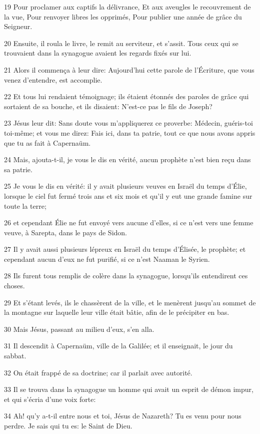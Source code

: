 \par 19 Pour proclamer aux captifs la délivrance, Et aux aveugles le recouvrement de la vue, Pour renvoyer libres les opprimés, Pour publier une année de grâce du Seigneur.
\par 20 Ensuite, il roula le livre, le remit au serviteur, et s'assit. Tous ceux qui se trouvaient dans la synagogue avaient les regards fixés sur lui.
\par 21 Alors il commença à leur dire: Aujourd'hui cette parole de l'Écriture, que vous venez d'entendre, est accomplie.
\par 22 Et tous lui rendaient témoignage; ils étaient étonnés des paroles de grâce qui sortaient de sa bouche, et ils disaient: N'est-ce pas le fils de Joseph?
\par 23 Jésus leur dit: Sans doute vous m'appliquerez ce proverbe: Médecin, guéris-toi toi-même; et vous me direz: Fais ici, dans ta patrie, tout ce que nous avons appris que tu as fait à Capernaüm.
\par 24 Mais, ajouta-t-il, je vous le dis en vérité, aucun prophète n'est bien reçu dans sa patrie.
\par 25 Je vous le dis en vérité: il y avait plusieurs veuves en Israël du temps d'Élie, lorsque le ciel fut fermé trois ans et six mois et qu'il y eut une grande famine sur toute la terre;
\par 26 et cependant Élie ne fut envoyé vers aucune d'elles, si ce n'est vers une femme veuve, à Sarepta, dans le pays de Sidon.
\par 27 Il y avait aussi plusieurs lépreux en Israël du temps d'Élisée, le prophète; et cependant aucun d'eux ne fut purifié, si ce n'est Naaman le Syrien.
\par 28 Ils furent tous remplis de colère dans la synagogue, lorsqu'ils entendirent ces choses.
\par 29 Et s'étant levés, ils le chassèrent de la ville, et le menèrent jusqu'au sommet de la montagne sur laquelle leur ville était bâtie, afin de le précipiter en bas.
\par 30 Mais Jésus, passant au milieu d'eux, s'en alla.
\par 31 Il descendit à Capernaüm, ville de la Galilée; et il enseignait, le jour du sabbat.
\par 32 On était frappé de sa doctrine; car il parlait avec autorité.
\par 33 Il se trouva dans la synagogue un homme qui avait un esprit de démon impur, et qui s'écria d'une voix forte:
\par 34 Ah! qu'y a-t-il entre nous et toi, Jésus de Nazareth? Tu es venu pour nous perdre. Je sais qui tu es: le Saint de Dieu.
